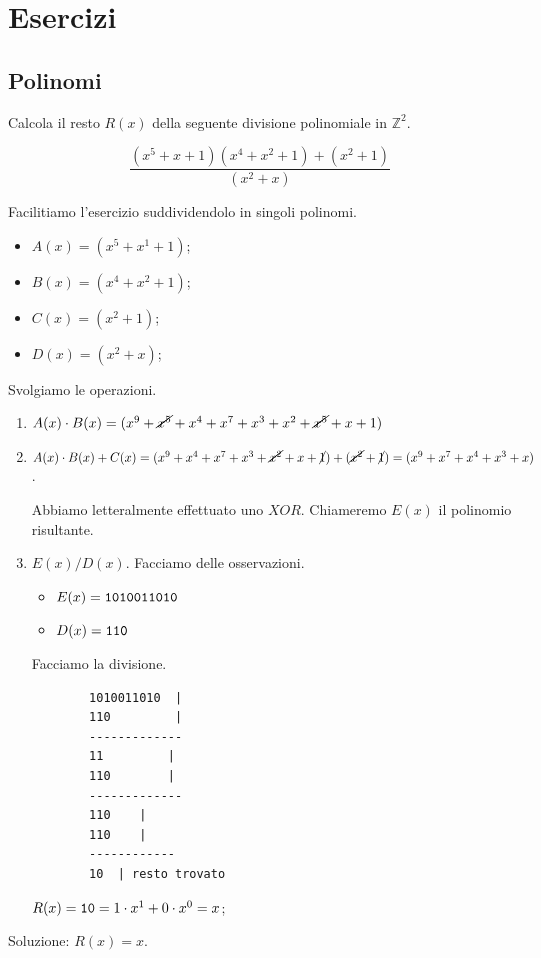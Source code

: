 
\chapter{Esercizi}

\section{Polinomi}
Calcola il resto $R(x)$ della seguente divisione polinomiale in $\mathbb{Z}^2$. 

$$
\frac{(x^5 + x + 1) (x^4 + x^2 + 1) + (x^2+1)}{(x^2 + x)}
$$

Facilitiamo l'esercizio suddividendolo in singoli polinomi.
\begin{itemize}
	\item $A(x) = (x^5 + x^1 + 1)$;
	\item $B(x) = (x^4 + x^2 + 1)$;
	\item $C(x) = (x^2 + 1)$;
	\item $D(x) = (x^2 + x)$;
\end{itemize}

Svolgiamo le operazioni.
\begin{enumerate}
	\item $A(x) \cdot B(x) = (x^9 + \cancel{x^5} + x^4 + x^7 + x^3 + x^2 + \cancel{x^5} + x + 1)$
	
	\item $A(x) \cdot B(x) + C(x) = (x^9 + x^4 + x^7 + x^3 + \cancel{x^2} + x + \cancel{1}) +  (\cancel{x^2} +\cancel{1}) = (x^9 + x^7+ x^4 + x^3 + x)$. 
	
	Abbiamo letteralmente effettuato uno $XOR$. Chiameremo $E(x)$ il polinomio risultante.
	
	\item $E(x)/D(x)$. Facciamo delle osservazioni.
	\begin{itemize}
		\item $E(x) = \verb|1010011010|$
		\item $D(x) = \verb|110|$
	\end{itemize}
	
	Facciamo la divisione.
	
	\begin{verbatim}
		1010011010  |
		110         |
		-------------
		11         |
		110        |
		-------------
		110    |
		110    |
		------------
		10  | resto trovato
	\end{verbatim}
	
	$R(x) = \verb|10| = 1\cdot x^1 + 0\cdot x^0 = x$;
\end{enumerate}

Soluzione: $R(x) = x$.